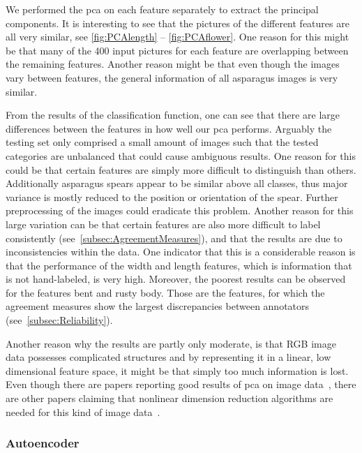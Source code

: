 We performed the \acrshort{pca} on each feature separately to extract the principal components. It is interesting to see that the pictures of the different features are all very similar, see \autoref{fig:PCAlength} -- \autoref{fig:PCAflower}. One reason for this might be that many of the 400 input pictures for each feature are overlapping between the remaining features. Another reason might be that even though the images vary between features, the general information of all asparagus images is very similar.

\bigskip
From the results of the classification function, one can see that there are large differences between the features in how well our \acrshort{pca} performs. Arguably the testing set only comprised a small amount of images such that the tested categories are unbalanced that could cause ambiguous results.
One reason for this could be that certain features are simply more difficult to distinguish than others. Additionally asparagus spears appear to be similar above all classes, thus major variance is mostly reduced to the position or orientation of the spear. Further preprocessing of the images could eradicate this problem. Another reason for this large variation can be that certain features are also more difficult to label consistently (see~\autoref{subsec:AgreementMeasures}), and that the results are due to inconsistencies within the data. One indicator that this is a considerable reason is that the performance of the width and length features, which is information that is not hand-labeled, is very high. Moreover, the poorest results can be observed for the features bent and rusty body. Those are the features, for which the agreement measures show the largest discrepancies between annotators (see~\autoref{subsec:Reliability}). 

\bigskip
Another reason why the results are partly only moderate, is that RGB image data possesses complicated structures and by representing it in a linear, low dimensional feature space, it might be that simply too much information is lost. Even though there are papers reporting good results of \acrshort{pca} on image data~\citep{turk1991face,lata2009}, there are other papers claiming that nonlinear dimension reduction algorithms are needed for this kind of image data~\citep{olaode2014}.


\subsubsection{Autoencoder}
\label{subsec:Autoencoder}

